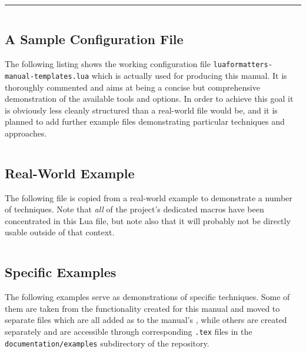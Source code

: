 \documentclass[12pt]{scrartcl}
\begin{document}
\hrule

\inputminted{tex}{examples/luaformatters-mwe.tex}





\subsection{A Sample Configuration File}
\label{sec:examples:manual-templates}

The following listing shows the working configuration file
\texttt{luaformatters-manual-templates.lua} which is actually used for producing
this manual. It is thoroughly commented and aims at being a concise but
comprehensive demonstration of the available tools and options.  In order to
achieve this goal it is obviously less cleanly structured than a real-world file
would be, and it is planned to add further example files demonstrating
particular techniques and approaches.

\inputminted[firstline=11]{lua}{luaformatters-manual.lua}

\enlargethispage*{4\baselineskip}

\subsection{Real-World Example}
\label{sec:examples:real-world-example}

The following file is copied from a real-world example to demonstrate a number of techniques.  Note that \emph{all} of the project's dedicated macros have been concentrated in this Lua file, but note also that it will probably not be directly usable outside of that context.

\inputminted{lua}{examples/luaformatters-schubert.lua}


\subsection{Specific Examples}
\label{sec:specific-examples}

The following examples serve as demonstrations of specific techniques.  Some of
them are taken from the functionality created for this manual and moved to
separate files which are all added as  to the manual's
, while others are created separately and are accessible
through corresponding \texttt{.tex} files in the \texttt{documentation/examples}
subdirectory of the repository.
\end{document}
